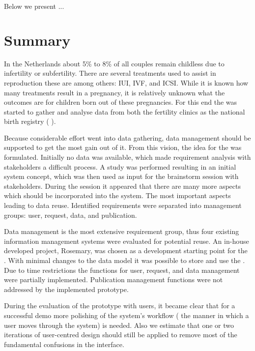 Below we present ...

\section{Summary}

In the Netherlands about 5\% to 8\% of all couples remain childless due to infertility or subfertility.
There are several treatments used to assist in reproduction these are among others: IUI, IVF, and ICSI.
While it is known how many treatments result in a pregnancy, it is relatively unknown what the outcomes are for children born out of these pregnancies.
For this end the \project{} was started to gather and analyse data from both the fertility clinics as the national birth registry (\ie{} \PRN{}).

Because considerable effort went into data gathering, data management should be supported to get the most gain out of it.
From this vision, the idea for the \ivfsystem{} was formulated.
Initially no data was available, which made requirement analysis with stakeholders a difficult process.
A study was performed resulting in an initial system concept, which was then used as input for the brainstorm session with stakeholders.
During the session it appeared that there are many more aspects which should be incorporated into the system.
The most important aspects leading to data reuse.
Identified requirements were separated into management groups: user, request, data, and publication.

Data management is the most extensive requirement group, thus four existing information management systems were evaluated for potential reuse.
An in-house developed project, Rosemary, was chosen as a development starting point for the \ivfsystem{}.
With minimal changes to the data model it was possible to store and use the \projectdata{}.
Due to time restrictions the functions for user, request, and data management were partially implemented.
Publication management functions were not addressed by the implemented prototype.

During the evaluation of the prototype with users, it became clear that for a successful demo more polishing of the system's workflow (\ie{} the manner in which a user moves through the system) is needed.
Also we estimate that one or two iterations of user-centred design should still be applied to remove most of the fundamental confusions in the interface.

